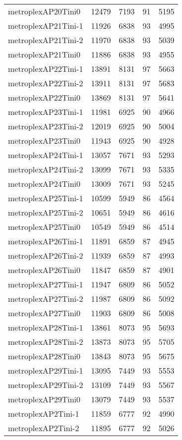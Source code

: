 \begin{longtable}{lrrrr}
metroplexAP20Tini0 & 12479 & 7193 & 91 & 5195 \\
metroplexAP21Tini-1 & 11926 & 6838 & 93 & 4995 \\
metroplexAP21Tini-2 & 11970 & 6838 & 93 & 5039 \\
metroplexAP21Tini0 & 11886 & 6838 & 93 & 4955 \\
metroplexAP22Tini-1 & 13891 & 8131 & 97 & 5663 \\
metroplexAP22Tini-2 & 13911 & 8131 & 97 & 5683 \\
metroplexAP22Tini0 & 13869 & 8131 & 97 & 5641 \\
metroplexAP23Tini-1 & 11981 & 6925 & 90 & 4966 \\
metroplexAP23Tini-2 & 12019 & 6925 & 90 & 5004 \\
metroplexAP23Tini0 & 11943 & 6925 & 90 & 4928 \\
metroplexAP24Tini-1 & 13057 & 7671 & 93 & 5293 \\
metroplexAP24Tini-2 & 13099 & 7671 & 93 & 5335 \\
metroplexAP24Tini0 & 13009 & 7671 & 93 & 5245 \\
metroplexAP25Tini-1 & 10599 & 5949 & 86 & 4564 \\
metroplexAP25Tini-2 & 10651 & 5949 & 86 & 4616 \\
metroplexAP25Tini0 & 10549 & 5949 & 86 & 4514 \\
metroplexAP26Tini-1 & 11891 & 6859 & 87 & 4945 \\
metroplexAP26Tini-2 & 11939 & 6859 & 87 & 4993 \\
metroplexAP26Tini0 & 11847 & 6859 & 87 & 4901 \\
metroplexAP27Tini-1 & 11947 & 6809 & 86 & 5052 \\
metroplexAP27Tini-2 & 11987 & 6809 & 86 & 5092 \\
metroplexAP27Tini0 & 11903 & 6809 & 86 & 5008 \\
metroplexAP28Tini-1 & 13861 & 8073 & 95 & 5693 \\
metroplexAP28Tini-2 & 13873 & 8073 & 95 & 5705 \\
metroplexAP28Tini0 & 13843 & 8073 & 95 & 5675 \\
metroplexAP29Tini-1 & 13095 & 7449 & 93 & 5553 \\
metroplexAP29Tini-2 & 13109 & 7449 & 93 & 5567 \\
metroplexAP29Tini0 & 13079 & 7449 & 93 & 5537 \\
metroplexAP2Tini-1 & 11859 & 6777 & 92 & 4990 \\
metroplexAP2Tini-2 & 11895 & 6777 & 92 & 5026 \\

\end{longtable}
